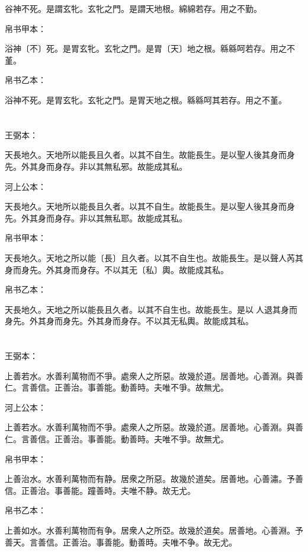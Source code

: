 \documentclass[a5paper]{ctexbook}
\begin{document}
    谷神不死。是謂玄牝。玄牝之門。是謂天地根。綿綿若存。用之不勤。

    帛书甲本：

    浴神〔不〕死。是胃玄牝。玄牝之門。是胃〔天〕地之根。緜緜呵若存。用之不堇。

    帛书乙本：

    浴神不死。是胃玄牝。玄牝之門。是胃天地之根。緜緜呵其若存。用之不堇。

    \chapter{}
    王弼本：

    天長地久。天地所以能長且久者。以其不自生。故能長生。是以聖人後其身而身先。外其身而身存。非以其無私邪。故能成其私。

    河上公本：

    天長地久。天地所以能長且久者。以其不自生。故能長生。是以聖人後其身而身先。外其身而身存。非以其無私耶。故能成其私。

    帛书甲本：

    天長地久。天地之所以能〔長〕且久者。以其不自生也。故能長生。是以聲人芮其身而身先。外其身而身存。不以其无〔私〕輿。故能成其私。

    帛书乙本：

    天長地久。天地之所以能長且久者。以其不自生也。故能長生。是以𦔻人退其身而身先。外其身而身先。外其身而身存。不以其无私輿。故能成其私。

    \chapter{}
    王弼本：

    上善若水。水善利萬物而不爭。處衆人之所惡。故幾於道。居善地。心善淵。與善仁。言善信。正善治。事善能。動善時。夫唯不爭。故無尤。

    河上公本：

    上善若水。水善利萬物而不爭。處衆人之所惡。故幾於道。居善地。心善淵。與善仁。言善信。正善治。事善能。動善時。夫唯不爭。故無尤。

    帛书甲本：

    上善治水。水善利萬物而有静。居衆之所惡。故幾於道矣。居善地。心善潚。予善信。正善治。事善能。蹱善時。夫唯不静。故无尤。

    帛书乙本：

    上善如水。水善利萬物而有争。居衆人之所亞。故幾於道矣。居善地。心善淵。予善天。言善信。正善治。事善能。動善時。夫唯不争。故无尤。
\end{document}
